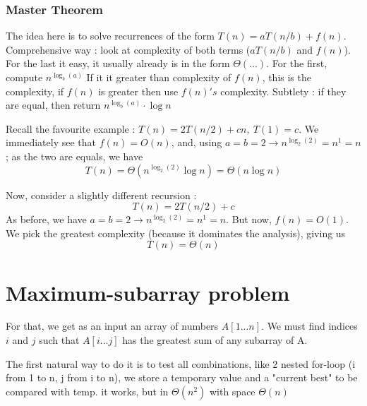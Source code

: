 \documentclass[12pt,twoside,a4paper]{article}
\begin{document}
\subsubsection{Master Theorem}
The idea here is to solve recurrences of the form $T(n) = a T(n/b) + f(n)$. Comprehensive way : look at complexity of both terms ($aT(n/b)$ and $f(n)$). For the last it easy, it usually already is in the form $\Theta(...)$. For the first, compute \uline{$n^{\log_b(a)}$}
If it it greater than complexity of $f(n)$, this is the complexity, if $f(n)$ is greater then use $f(n)'s$ complexity. Subtlety : if they are equal, then return $n^{\log_b(a)} \cdot \log n$
\begin{exemple}
	Recall the favourite example : $T(n) = 2T(n/2) + cn,\ T(1) = c$. We immediately see that $f(n) = O(n)$, and, using $a = b = 2 \to n^{\log_{2}(2)} = n^1 = n$ ; as the two are equals, we have 
	\[T(n) = \Theta(n^{\log_2(2)} \log n) = \Theta(n \log n)\]
\end{exemple}
\begin{exemple}
	Now, consider a slightly different recursion :
	\[T(n) = 2T(n/2) + c\]
	As before, we have $a = b = 2 \to n^{\log_{2}(2)} = n^1 = n$. But now, $f(n) = O(1)$. We pick the greatest complexity (because it dominates the analysis), giving us 
	\[T(n) = \Theta(n)\]
\end{exemple}


\section{Maximum-subarray problem}
For that, we get as an input an array of numbers $A[1...n]$. We must find indices $i$ and $j$ such that $A[i...j]$ has the greatest sum of any subarray of A. 

The first natural way to do it is to test all combinations, like 2 nested for-loop (i from 1 to n, j from i to n), we store a temporary value and a "current best" to be compared with temp. it works, but in $\Theta(n^2)$ with space $\Theta(n)$
\end{document}
